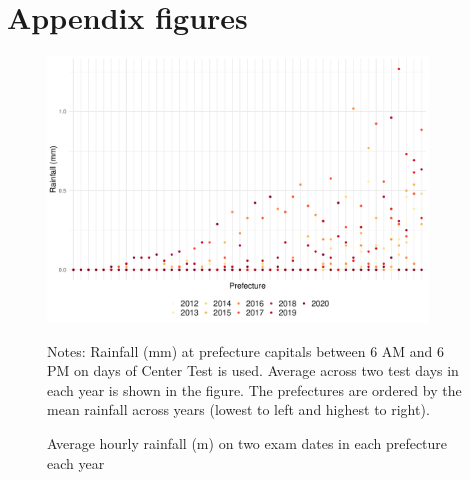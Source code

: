 \documentclass[12pt,letterpaper]{article}
\begin{document}
\setcounter{figure}{0}
\setcounter{table}{0}
\renewcommand\thefigure{\Alph{section}.\arabic{figure}}
\renewcommand\thetable{\Alph{section}.\arabic{table}}
  
\section{Appendix figures}\label{sec:appendix_figure}

\begin{figure}[H]
  \centering
  \caption{Average hourly rainfall (m) on two exam dates in each prefecture each year}
  \includegraphics[width = 0.9\textwidth]{../Output/images/rainfall_diff.pdf}
  \label{fig:rainfall_diff}
  \footnotesize
  \begin{tablenotes}
    \item Notes:
      Rainfall (mm) at prefecture capitals between 6 AM and 6 PM on days of Center Test is used.
      Average across two test days in each year is shown in the figure.
      The prefectures are ordered by the mean rainfall across years (lowest to left and highest to right).
  \end{tablenotes}
\end{figure}
\end{document}
